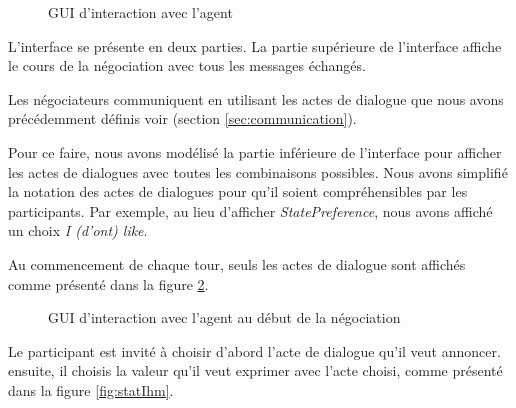 {					\begin{figure}[t]
						\centering
						\caption{GUI d'interaction avec l'agent}
						\label{fig:ihm}
					\end{figure} 
				
				
					L'interface se présente en deux parties. La partie supérieure de l'interface affiche le cours de la négociation avec tous les messages échangés. 
					 
					Les négociateurs communiquent en utilisant les actes de dialogue que nous avons précédemment définis voir (section \ref {sec:communication}). 

					Pour ce faire, nous avons modélisé la partie inférieure de l'interface pour afficher les actes de dialogues avec toutes les combinaisons possibles. 
					Nous avons simplifié la notation des actes de dialogues pour qu'il soient compréhensibles par les participants. Par exemple, au lieu d'afficher \emph{StatePreference}, nous avons affiché un choix \emph{I (d'ont) like}.
					
					Au commencement de chaque tour, seuls les actes de dialogue sont affichés comme présenté dans la figure \ref{fig:commencement}. 
					\begin{figure}[t]
						\centering
						\caption{GUI d'interaction avec l'agent au début de la négociation}
						\label{fig:commencement}
					\end{figure} 
					Le participant est invité à choisir d'abord l'acte de dialogue qu'il veut annoncer. ensuite, il choisis la valeur qu'il veut exprimer avec l'acte choisi, comme présenté dans la figure \ref{fig:statIhm}.
					
}

